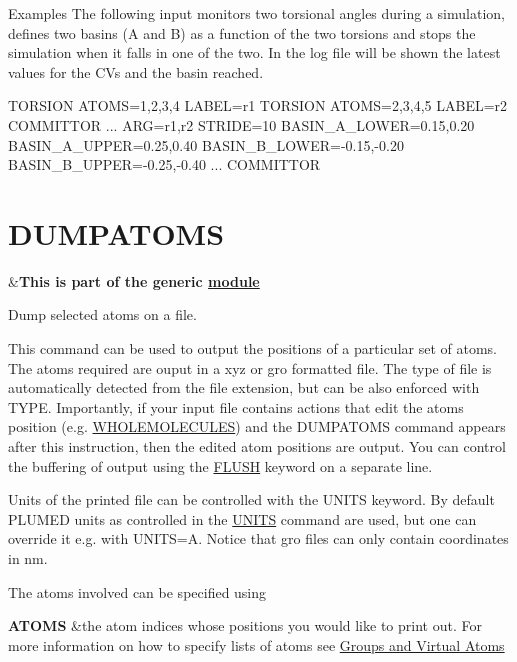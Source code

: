 \begin{DoxyParagraph}{Examples}
The following input monitors two torsional angles during a simulation, defines two basins (A and B) as a function of the two torsions and stops the simulation when it falls in one of the two. In the log file will be shown the latest values for the C\+Vs and the basin reached. \begin{DoxyVerb}TORSION ATOMS=1,2,3,4 LABEL=r1
TORSION ATOMS=2,3,4,5 LABEL=r2
COMMITTOR ...
  ARG=r1,r2 
  STRIDE=10
  BASIN_A_LOWER=0.15,0.20 
  BASIN_A_UPPER=0.25,0.40 
  BASIN_B_LOWER=-0.15,-0.20 
  BASIN_B_UPPER=-0.25,-0.40 
... COMMITTOR 
\end{DoxyVerb}
 
\end{DoxyParagraph}
\hypertarget{DUMPATOMS}{}\section{D\+U\+M\+P\+A\+T\+O\+M\+S}\label{DUMPATOMS}
\begin{TabularC}{2}
\hline
&{\bfseries  This is part of the generic \hyperlink{mymodules}{module }}   \\
\end{TabularC}
Dump selected atoms on a file.

This command can be used to output the positions of a particular set of atoms. The atoms required are ouput in a xyz or gro formatted file. The type of file is automatically detected from the file extension, but can be also enforced with T\+Y\+P\+E. Importantly, if your input file contains actions that edit the atoms position (e.\+g. \hyperlink{WHOLEMOLECULES}{W\+H\+O\+L\+E\+M\+O\+L\+E\+C\+U\+L\+E\+S}) and the D\+U\+M\+P\+A\+T\+O\+M\+S command appears after this instruction, then the edited atom positions are output. You can control the buffering of output using the \hyperlink{FLUSH}{F\+L\+U\+S\+H} keyword on a separate line.

Units of the printed file can be controlled with the U\+N\+I\+T\+S keyword. By default P\+L\+U\+M\+E\+D units as controlled in the \hyperlink{UNITS}{U\+N\+I\+T\+S} command are used, but one can override it e.\+g. with U\+N\+I\+T\+S=A. Notice that gro files can only contain coordinates in nm.

\begin{DoxyParagraph}{The atoms involved can be specified using}

\end{DoxyParagraph}
\begin{TabularC}{2}
\hline
{\bfseries  A\+T\+O\+M\+S } &the atom indices whose positions you would like to print out. For more information on how to specify lists of atoms see \hyperlink{Group}{Groups and Virtual Atoms}   \\
\end{TabularC}


